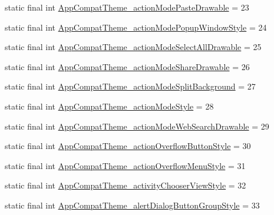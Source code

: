 \begin{DoxyCompactItemize}
\item 
static final int \mbox{\hyperlink{classandroid_1_1support_1_1v7_1_1appcompat_1_1_r_1_1styleable_a3b4a44d4a3bf772d0bd2d1c52a936410}{App\+Compat\+Theme\+\_\+action\+Mode\+Paste\+Drawable}} = 23
\item 
static final int \mbox{\hyperlink{classandroid_1_1support_1_1v7_1_1appcompat_1_1_r_1_1styleable_a8d98d8c2f53bcb89baa6fd0c634ab512}{App\+Compat\+Theme\+\_\+action\+Mode\+Popup\+Window\+Style}} = 24
\item 
static final int \mbox{\hyperlink{classandroid_1_1support_1_1v7_1_1appcompat_1_1_r_1_1styleable_a41fe841d7bc11225c18c0c827d268c8a}{App\+Compat\+Theme\+\_\+action\+Mode\+Select\+All\+Drawable}} = 25
\item 
static final int \mbox{\hyperlink{classandroid_1_1support_1_1v7_1_1appcompat_1_1_r_1_1styleable_a0be771e2eec60d3213d846c193207c7d}{App\+Compat\+Theme\+\_\+action\+Mode\+Share\+Drawable}} = 26
\item 
static final int \mbox{\hyperlink{classandroid_1_1support_1_1v7_1_1appcompat_1_1_r_1_1styleable_a55686d3f8a4a36da4600b95a031ae5a8}{App\+Compat\+Theme\+\_\+action\+Mode\+Split\+Background}} = 27
\item 
static final int \mbox{\hyperlink{classandroid_1_1support_1_1v7_1_1appcompat_1_1_r_1_1styleable_a7ca0a5b79ce6df69ed747815cfbc1393}{App\+Compat\+Theme\+\_\+action\+Mode\+Style}} = 28
\item 
static final int \mbox{\hyperlink{classandroid_1_1support_1_1v7_1_1appcompat_1_1_r_1_1styleable_aa4d2250c23905d8eb9283eb41b538c9b}{App\+Compat\+Theme\+\_\+action\+Mode\+Web\+Search\+Drawable}} = 29
\item 
static final int \mbox{\hyperlink{classandroid_1_1support_1_1v7_1_1appcompat_1_1_r_1_1styleable_ae43e133d0d034c207d693944cfa71589}{App\+Compat\+Theme\+\_\+action\+Overflow\+Button\+Style}} = 30
\item 
static final int \mbox{\hyperlink{classandroid_1_1support_1_1v7_1_1appcompat_1_1_r_1_1styleable_a10ebea615be04732b64922dd7e32746e}{App\+Compat\+Theme\+\_\+action\+Overflow\+Menu\+Style}} = 31
\item 
static final int \mbox{\hyperlink{classandroid_1_1support_1_1v7_1_1appcompat_1_1_r_1_1styleable_a2d98c8d3e08a265b2cbdde0a14c9beae}{App\+Compat\+Theme\+\_\+activity\+Chooser\+View\+Style}} = 32
\item 
static final int \mbox{\hyperlink{classandroid_1_1support_1_1v7_1_1appcompat_1_1_r_1_1styleable_a0961260b8f5e7a60a37468ab95220752}{App\+Compat\+Theme\+\_\+alert\+Dialog\+Button\+Group\+Style}} = 33

\end{DoxyCompactItemize}
